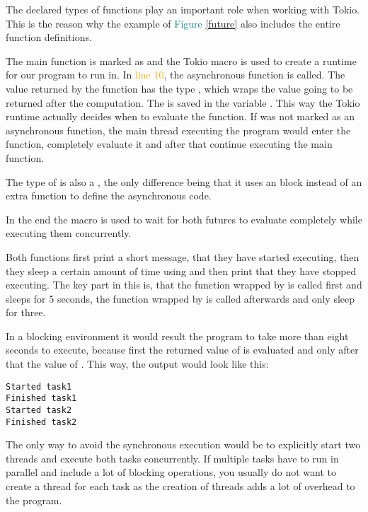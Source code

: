 The declared types of functions play an important role when working with Tokio. This is the reason why the example
of \textcolor{teal}{Figure \ref{future}} also includes the entire function definitions.

The main function is marked as  and the Tokio macro is used to create a runtime for our program to run in.
In \textcolor{orange}{line 10}, the asynchronous function  is called. The value returned by the
function has the type , which wraps the value going to be returned after the computation. The
 is saved in the variable . This way the Tokio runtime actually decides when to evaluate the
function. If  was not marked as an asynchronous function, the main thread executing the program
would enter the function, completely evaluate it and after that continue executing the main function.

The type of  is also a , the only difference being that it uses an  block
instead of an extra function to define the asynchronous code.

In the end the macro  is used to wait for both futures to evaluate completely while executing them
concurrently.

Both functions first print a short message, that they have started executing, then they sleep a certain amount of time
using  and then print that they have stopped executing. The key part in this is, that the
function wrapped by  is called first and sleeps for 5 seconds, the function wrapped by  is
called afterwards and only sleep for three.

In a blocking environment it would result the program to take more than eight seconds to execute, because first the
returned value of  is evaluated and only after that the value of . This way, the output
would look like this:

\begin{verbatim}
Started task1
Finished task1
Started task2
Finished task2
\end{verbatim}

The only way to avoid the synchronous execution would be to explicitly start two threads and execute both tasks
concurrently. If multiple tasks have to run in parallel and include a lot of blocking operations, you usually do not
want to create a thread for each task as the creation of threads adds a lot of overhead to the program.

